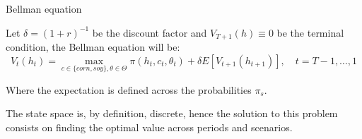 \documentclass[notes,11pt, aspectratio=169]{beamer}
\newenvironment{wideitemize}{\itemize\addtolength{\itemsep}{10pt}}{\enditemize}
\begin{document}
\begin{frame}{Bellman equation}
    \begin{wideitemize}
        \item Let $\delta = (1+r)^{-1}$ be the discount factor and $V_{T+1}(h)\equiv 0$ be the terminal condition, the Bellman equation will be:
        \begin{equation}
            V_{t}(h_{t}) = \max_{c\in\{corn,soy\},\theta\in\Theta}\pi(h_{t},c_{t},\theta_{t})+\delta E\left[V_{t+1}(h_{t+1})\right],\quad t=T-1,\dots,1
        \end{equation}
        \item Where the expectation is defined across the probabilities $\pi_{s}$.
        \item The state space is, by definition, discrete, hence the solution to this problem consists on finding the optimal value across periods and scenarios.
    \end{wideitemize}
\end{frame}
\end{document}

